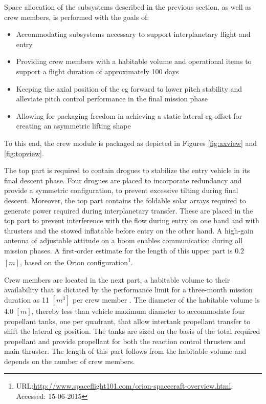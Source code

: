 Space allocation of the subsystems described in the previous section, as well as crew members, is performed with the goals of:
\begin{itemize}
\item Accommodating subsystems necessary to support interplanetary flight and entry
\item Providing crew members with a habitable volume and operational items to support a flight duration of approximately 100 days
\item Keeping the axial position of the \gls{cg} forward to lower pitch stability and alleviate pitch control performance in the final mission phase
\item Allowing for packaging freedom in achieving a static lateral \gls{cg} offset for creating an asymmetric lifting shape
\end{itemize}
To this end, the crew module is packaged as depicted in Figures \ref{fig:axview} and \ref{fig:topview}. 

The top part is required to contain drogues to stabilize the entry vehicle in its final descent phase. Four drogues are placed to incorporate redundancy and provide
a symmetric configuration, to prevent excessive tilting during final descent. Moreover, the top part contains the foldable solar arrays required to generate power required during interplanetary transfer. These are placed in the top part to prevent interference with the flow during entry on one hand and with thrusters and the stowed inflatable before entry on the other hand. A high-gain antenna of adjustable attitude on a boom enables communication during all mission phases. A first-order estimate for the length of this upper part is $0.2$ $[m]$, based on the Orion configuration\footnote{URL:\url{http://www.spaceflight101.com/orion-spacecraft-overview.html}. Accessed: 15-06-2015}.

Crew members are located in the next part, a habitable volume to their availability that is dictated by the performance limit for a three-month mission duration as 11 $[m^{3}]$ per crew member \cite{Rudisill2008}. The diameter of the habitable volume is 4.0 $[m]$, thereby less than vehicle maximum diameter to accommodate four propellant tanks, one per quadrant, that allow intertank propellant transfer to shift the lateral \gls{cg} position. The tanks are sized on the basis of the total required propellant and provide propellant for both the reaction control thrusters and main thruster. The length of this part follows from the habitable volume and depends on the number of crew members.

